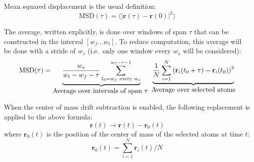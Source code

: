 \documentclass{article}
\begin{document}
\thispagestyle{empty}
\pagestyle{empty}  

Mean squared displacement is the usual definition:
%
$$\mbox{MSD}(\tau)= \langle | \mathbf r (\tau) - \mathbf r(0) |^2 \rangle $$

The average, written explicitly, is done over windows of span $\tau$
that can be constructed in the interval $[w_f \dots w_t]$. To reduce
computation, this average will be done with a stride of $w_s$ (i.e.\
only one window every $w_s$ will be considered):
%
$$\mbox{MSD}(\tau)= \underbrace{ 
  \frac{w_s}{w_t-w_f-\tau} 
  \sum_{t_0=w_f \mbox{ \scriptsize every } w_s}^{w_t-\tau-1}
 }_{\mbox{Average over intervals of span $\tau$ }}  
 \underbrace{ 
   \frac{1}{N}
   \sum_{i=1}^N
   \left(
     \mathbf r_i(t_0+\tau) - \mathbf r_i(t_0) 
   \right)^2
 }_{\mbox{Average over selected atoms}}
$$

When the center of mass drift subtraction is enabled, the following
replacement is applied to the above formula:
%
$$\mathbf r(t) \to \mathbf r(t)-\mathbf r_0(t)$$
%
where $\mathbf r_0(t)$ is the position of the center
of mass of the selected atoms at time $t$:
%
$$\mathbf r_0(t)=\sum_{i=1}^N \mathbf r_i(t) /N$$
\end{document}
